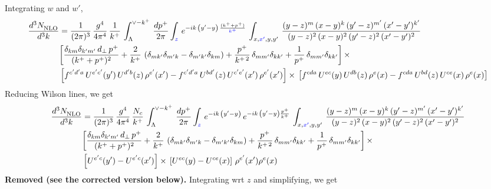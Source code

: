 \documentclass[9pt]{article}
\numberwithin{equation}{section}
\begin{document}
Integrating $w$ and $w'$,
\begin{align}
     \frac{d^{3}N_{\rm NLO}^{\rm}}{d^{3}k}  & = \frac{1}{(2\pi)^{3}}\,\frac{g^{4}}{4\pi^{4}}\,\frac{1}{k^{+}}\,\int_{\Lambda}^{\vee-k^{+}}\, \frac{dp^{+}}{2\pi}\int_{{\color{blue}z}}\,e^{-ik\,\left(y'-y\right)\, \frac{(k^{+}+p^{+})}{{\color{blue}k^{+}}}}\,\int_{x,{\color{blue}x'},y,y^{\prime}}\,\frac{(y-z)^{m}\,(x-y)^{k}\,(y'-z)^{m'}\,(x'-y')^{k'}}{(y-z)^{2}\,(x-y)^{2}\,(y'-z)^{2}\,(x'-y')^{2}}\notag \\ &  \bigg[\frac{\delta_{km}\delta_{k'm'}\,d_{\perp}\,p^{+}}{(k^{+}+p^{+})^{2}}+\frac{2}{k^{+}}\,\left(\delta_{mk'}\delta_{m'k}-\delta_{m'k'}\delta_{km}\right) + \frac{p^{+}}{k^{+\,2}}\,\delta_{mm'}\delta_{kk'}+\frac{1}{p^{+}}\,\delta_{mm'}\delta_{kk'}\bigg]\,\times\,\notag \\ & \left[f^{c'd'a}\,U^{e'c'}(y')\,U^{d'b}(z)\,\rho^{e'}(x')-f^{c'd'a}\, 
    U^{bd'}(z)\,U^{c'e'}(x')\,\rho^{e'}(x')\right]\times\, \left[f^{cda}\,U^{ec}(y)\,U^{db}(z)\,\rho^{e}(x)-f^{cda}\, 
    U^{bd}(z)\,U^{ce}(x)\,\rho^{e}(x)\right]
\end{align}
Reducing Wilson lines, we get
\begin{align}
     \frac{d^{3}N_{\rm NLO}^{\rm}}{d^{3}k}  & = \frac{1}{(2\pi)^{3}}\,\frac{g^{4}}{4\pi^{4}}\,\frac{N_{c}}{k^{+}}\,\int_{\Lambda}^{\vee-k^{+}}\, \frac{dp^{+}}{2\pi}\int_{{\color{blue}z}}\,e^{-ik\,\left(y'-y\right)}\,e^{-ik\,\left(y'-y\right)\frac{p^{+}}{k^{+}}}\,\int_{x,{\color{blue}x'},y,y^{\prime}}\,\frac{(y-z)^{m}\,(x-y)^{k}\,(y'-z)^{m'}\,(x'-y')^{k'}}{(y-z)^{2}\,(x-y)^{2}\,(y'-z)^{2}\,(x'-y')^{2}}\notag \\ &  \bigg[\frac{\delta_{km}\delta_{k'm'}\,d_{\perp}\,p^{+}}{(k^{+}+p^{+})^{2}}+\frac{2}{k^{+}}\,\left(\delta_{mk'}\delta_{m'k}-\delta_{m'k'}\delta_{km}\right) + \frac{p^{+}}{k^{+\,2}}\,\delta_{mm'}\delta_{kk'}+\frac{1}{p^{+}}\,\delta_{mm'}\delta_{kk'}\bigg]\,\times\,\notag \\ & \left[U^{e'c}(y') - U^{e'c}(x')\right] \times\, \left[U^{ec}(y) - U^{ce}(x)\right]\, \rho^{e'}(x') \rho^{e}(x)
\end{align}
{\color{red}\textbf{Removed (see the corrected version below).}} \begingroup\color{red}Integrating wrt $z$ and simplifying, we get\endgroup
\end{document}
